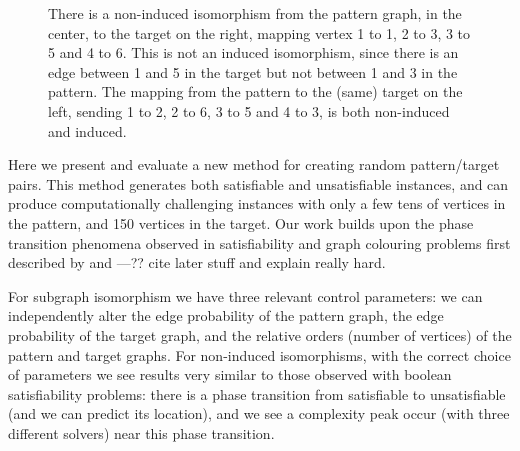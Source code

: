 \documentclass[letterpaper]{article}
\begin{document}
\begin{figure}[b]

    \caption{There is a non-induced isomorphism from the pattern graph, in the center, to the target
    on the right, mapping vertex 1 to 1, 2 to 3, 3 to 5 and 4 to 6. This is not an induced
    isomorphism, since there is an edge between 1 and 5 in the target but not between 1 and 3 in the
    pattern. The mapping from the pattern to the (same) target on the left, sending 1 to 2, 2 to 6, 3 to
    5 and 4 to 3, is both non-induced and induced.}
    \label{figure:sip}
\end{figure}

Here we present and evaluate a new method for creating random pattern/target pairs. This method
generates both satisfiable and unsatisfiable instances, and can produce computationally challenging
instances with only a few tens of vertices in the pattern, and 150 vertices in the target. Our work
builds upon the phase transition phenomena observed in satisfiability and graph colouring problems
first described by \citet{Cheeseman:1991} and \citet{Mitchell:1992}---?? cite later stuff and
explain really hard.

For subgraph isomorphism we have three relevant control parameters: we can independently alter the
edge probability of the pattern graph, the edge probability of the target graph, and the relative
orders (number of vertices) of the pattern and target graphs.  For non-induced isomorphisms, with
the correct choice of parameters we see results very similar to those observed with boolean
satisfiability problems: there is a phase transition from satisfiable to unsatisfiable (and we can
predict its location), and we see a complexity peak occur (with three different solvers) near this
phase transition.
\end{document}

